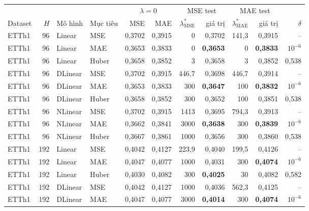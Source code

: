 {\footnotesize
\begin{longtable}{@{}lrll rr rr rr r@{}}
\toprule
 & & & & \multicolumn{2}{c}{$\lambda = 0$} & \multicolumn{2}{c}{MSE test} & \multicolumn{2}{c}{MAE test} & \\
\cmidrule(lr){5-6}\cmidrule(lr){7-8}\cmidrule(lr){9-10}
Dataset & $H$ & Mô hình & Mục tiêu & MSE & MAE & $\lambda^*_{\mathrm{MSE}}$ & giá trị & $\lambda^*_{\mathrm{MAE}}$ & giá trị & $\delta$ \\
\midrule
\endhead
ETTh1 & 96 & Linear & MSE & 0{,}3702 & 0{,}3915 & 0 & 0{,}3702 & 141{,}3 & 0{,}3915 & -- \\
ETTh1 & 96 & Linear & MAE & 0{,}3653 & 0{,}3833 & 0 & \textbf{0{,}3653} & 0 & \textbf{0{,}3833} & $10^{-6}$ \\
ETTh1 & 96 & Linear & Huber & 0{,}3658 & 0{,}3852 & 3 & 0{,}3658 & 3 & 0{,}3852 & 0{,}538 \\
\addlinespace[2pt]
ETTh1 & 96 & DLinear & MSE & 0{,}3702 & 0{,}3915 & 446{,}7 & 0{,}3698 & 446{,}7 & 0{,}3914 & -- \\
ETTh1 & 96 & DLinear & MAE & 0{,}3653 & 0{,}3833 & 300 & \textbf{0{,}3647} & 100 & \textbf{0{,}3832} & $10^{-6}$ \\
ETTh1 & 96 & DLinear & Huber & 0{,}3658 & 0{,}3852 & 300 & 0{,}3652 & 100 & 0{,}3851 & 0{,}538 \\
\addlinespace[2pt]
ETTh1 & 96 & NLinear & MSE & 0{,}3702 & 0{,}3915 & 1413 & 0{,}3695 & 794{,}3 & 0{,}3913 & -- \\
ETTh1 & 96 & NLinear & MAE & 0{,}3662 & 0{,}3841 & 3000 & \textbf{0{,}3638} & 300 & \textbf{0{,}3839} & $10^{-6}$ \\
ETTh1 & 96 & NLinear & Huber & 0{,}3667 & 0{,}3861 & 1000 & 0{,}3656 & 300 & 0{,}3860 & 0{,}538 \\
\addlinespace[2pt]
ETTh1 & 192 & Linear & MSE & 0{,}4042 & 0{,}4127 & 223{,}9 & 0{,}4040 & 199{,}5 & 0{,}4126 & -- \\
ETTh1 & 192 & Linear & MAE & 0{,}4047 & 0{,}4077 & 1000 & 0{,}4031 & 300 & \textbf{0{,}4074} & $10^{-6}$ \\
ETTh1 & 192 & Linear & Huber & 0{,}4030 & 0{,}4082 & 300 & \textbf{0{,}4025} & 30 & 0{,}4082 & 0{,}582 \\
\addlinespace[2pt]
ETTh1 & 192 & DLinear & MSE & 0{,}4042 & 0{,}4127 & 1000 & 0{,}4036 & 562{,}3 & 0{,}4125 & -- \\
ETTh1 & 192 & DLinear & MAE & 0{,}4047 & 0{,}4077 & 3000 & \textbf{0{,}4014} & 300 & \textbf{0{,}4074} & $10^{-6}$ \\

\end{longtable}}
